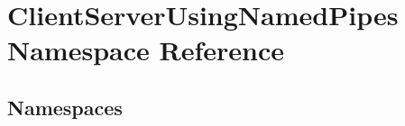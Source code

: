 \hypertarget{namespace_client_server_using_named_pipes}{}\section{Client\+Server\+Using\+Named\+Pipes Namespace Reference}
\label{namespace_client_server_using_named_pipes}
\subsection*{Namespaces}
\begin{DoxyCompactItemize}
\end{DoxyCompactItemize}
